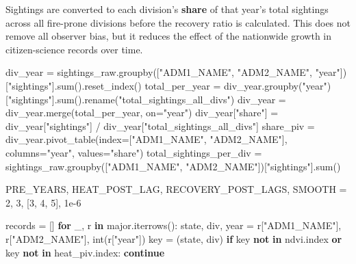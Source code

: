 \documentclass[
  letterpaper,
  DIV=11,
  numbers=noendperiod]{scrartcl}
\newenvironment{Shaded}{\begin{snugshade}}{\end{snugshade}}
\newcommand{\BuiltInTok}[1]{\textcolor[rgb]{0.00,0.23,0.31}{#1}}
\newcommand{\ControlFlowTok}[1]{\textcolor[rgb]{0.00,0.23,0.31}{\textbf{#1}}}
\newcommand{\DecValTok}[1]{\textcolor[rgb]{0.68,0.00,0.00}{#1}}
\newcommand{\FloatTok}[1]{\textcolor[rgb]{0.68,0.00,0.00}{#1}}
\newcommand{\KeywordTok}[1]{\textcolor[rgb]{0.00,0.23,0.31}{\textbf{#1}}}
\newcommand{\NormalTok}[1]{\textcolor[rgb]{0.00,0.23,0.31}{#1}}
\newcommand{\OperatorTok}[1]{\textcolor[rgb]{0.37,0.37,0.37}{#1}}
\newcommand{\StringTok}[1]{\textcolor[rgb]{0.13,0.47,0.30}{#1}}
\begin{document}
Sightings are converted to each division's \textbf{share} of that year's
total sightings across all fire-prone divisions before the recovery
ratio is calculated. This does not remove all observer bias, but it
reduces the effect of the nationwide growth in citizen-science records
over time.

\begin{Shaded}
\begin{Highlighting}[]
\NormalTok{div\_year }\OperatorTok{=}\NormalTok{ sightings\_raw.groupby([}\StringTok{"ADM1\_NAME"}\NormalTok{, }\StringTok{"ADM2\_NAME"}\NormalTok{, }\StringTok{"year"}\NormalTok{])[}\StringTok{"sightings"}\NormalTok{].}\BuiltInTok{sum}\NormalTok{().reset\_index()}
\NormalTok{total\_per\_year }\OperatorTok{=}\NormalTok{ div\_year.groupby(}\StringTok{"year"}\NormalTok{)[}\StringTok{"sightings"}\NormalTok{].}\BuiltInTok{sum}\NormalTok{().rename(}\StringTok{"total\_sightings\_all\_divs"}\NormalTok{)}
\NormalTok{div\_year }\OperatorTok{=}\NormalTok{ div\_year.merge(total\_per\_year, on}\OperatorTok{=}\StringTok{"year"}\NormalTok{)}
\NormalTok{div\_year[}\StringTok{"share"}\NormalTok{] }\OperatorTok{=}\NormalTok{ div\_year[}\StringTok{"sightings"}\NormalTok{] }\OperatorTok{/}\NormalTok{ div\_year[}\StringTok{"total\_sightings\_all\_divs"}\NormalTok{]}
\NormalTok{share\_piv }\OperatorTok{=}\NormalTok{ div\_year.pivot\_table(index}\OperatorTok{=}\NormalTok{[}\StringTok{"ADM1\_NAME"}\NormalTok{, }\StringTok{"ADM2\_NAME"}\NormalTok{], columns}\OperatorTok{=}\StringTok{"year"}\NormalTok{, values}\OperatorTok{=}\StringTok{"share"}\NormalTok{)}
\NormalTok{total\_sightings\_per\_div }\OperatorTok{=}\NormalTok{ sightings\_raw.groupby([}\StringTok{"ADM1\_NAME"}\NormalTok{, }\StringTok{"ADM2\_NAME"}\NormalTok{])[}\StringTok{"sightings"}\NormalTok{].}\BuiltInTok{sum}\NormalTok{()}

\NormalTok{PRE\_YEARS, HEAT\_POST\_LAG, RECOVERY\_POST\_LAGS, SMOOTH }\OperatorTok{=} \DecValTok{2}\NormalTok{, }\DecValTok{3}\NormalTok{, [}\DecValTok{3}\NormalTok{, }\DecValTok{4}\NormalTok{, }\DecValTok{5}\NormalTok{], }\FloatTok{1e{-}6}

\NormalTok{records }\OperatorTok{=}\NormalTok{ []}
\ControlFlowTok{for}\NormalTok{ \_, r }\KeywordTok{in}\NormalTok{ major.iterrows():}
\NormalTok{    state, div, year }\OperatorTok{=}\NormalTok{ r[}\StringTok{"ADM1\_NAME"}\NormalTok{], r[}\StringTok{"ADM2\_NAME"}\NormalTok{], }\BuiltInTok{int}\NormalTok{(r[}\StringTok{"year"}\NormalTok{])}
\NormalTok{    key }\OperatorTok{=}\NormalTok{ (state, div)}
    \ControlFlowTok{if}\NormalTok{ key }\KeywordTok{not} \KeywordTok{in}\NormalTok{ ndvi.index }\KeywordTok{or}\NormalTok{ key }\KeywordTok{not} \KeywordTok{in}\NormalTok{ heat\_piv.index:}
        \ControlFlowTok{continue}


\end{Highlighting}
\end{Shaded}
\end{document}

